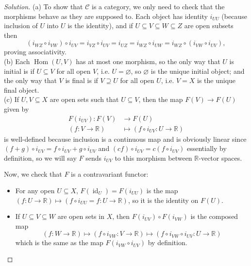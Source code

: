 \documentclass[10pt]{article}
\providecommand{\RR}{\mathbb R}
\providecommand{\ii}{\item}
\newenvironment{soln}{\begin{proof}[Solution]}{\end{proof}}
\providecommand{\Hom}{\operatorname{Hom}}
\providecommand{\id}{\operatorname{id}}
\begin{document}
\begin{soln}
    (a) To show that $\mathscr C$ is a category, we only need to check
    that the morphisms behave as they are supposed to.
    Each object has identity $i_{UU}$
    (because inclusion of $U$ into $U$ is the identity), and
    if $U\subseteq V\subseteq W\subseteq Z$ are open subsets then
    \begin{equation*}
	(i_{WZ}\circ i_{VW})\circ i_{UV} =
	i_{VZ}\circ i_{UV} =
	i_{UZ} =
	i_{WZ}\circ i_{UW} =
	i_{WZ}\circ(i_{VW}\circ i_{UV}),
    \end{equation*}
    proving associativity.
    \\

    (b) Each $\Hom(U,V)$ has at most one morphism, so
    the only way that $U$ is initial is if $U\subseteq V$ for all open $V$,
    i.e. $U = \varnothing$, so $\boxed{\varnothing}$ is the unique initial object;
    and the only way that $V$ is final is if $V\supseteq U$ for all open $U$,
    i.e. $V = \boxed X$ is the unique final object.
    \\

    (c) If $U,V\subseteq X$ are open sets
    such that $U\subseteq V$, then the map $F(V)\to F(U)$ given by
    \begin{align*}
	F(i_{UV}) : F(V)&\to F(U)\\
	(f\colon V\to\RR)&\mapsto (f\circ i_{UV}\colon U\to\RR)
    \end{align*}
    is well-defined because inclusion is a continuous map
    and is obviously linear since $(f+g)\circ i_{UV} = f\circ i_{UV} + g\circ i_{UV}$
    and $(cf)\circ i_{UV} = c(f\circ i_{UV})$ essentially by definition,
    so we will say $F$ sends $i_{UV}$
    to this morphism between $\RR$-vector spaces.

    Now, we check that $F$ is a contravariant functor:
    \begin{itemize}
	\ii For any open $U\subseteq X$, $F(\id_U) = F(i_{UU})$
	is the map $(f\colon U\to\RR)\mapsto(f\circ i_{UU} = f\colon U\to\RR)$,
	so it is the identity on $F(U)$.
	\ii If $U\subseteq V\subseteq W$ are open sets in $X$, then
	$F(i_{UV})\circ F(i_{VW})$ is the composed map
	\begin{equation*}
	    (f\colon W\to\RR)\mapsto(f\circ i_{VW}\colon V\to\RR)
	    \mapsto(f\circ i_{VW}\circ i_{UV}\colon U\to\RR)
	\end{equation*}
	which is the same as the map $F(i_{VW}\circ i_{UV})$ by definition.
    \end{itemize}
\end{soln}
\end{document}
